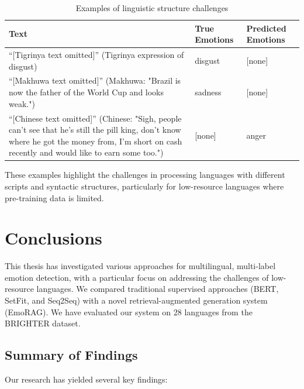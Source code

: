 \documentclass[a4paper,12pt]{extarticle}
\begin{document}
\begin{table}[h]
\centering
\begin{tabular}{|p{8.5cm}|p{2.5cm}|p{2.5cm}|}
\hline
\textbf{Text} & \textbf{True Emotions} & \textbf{Predicted Emotions} \\
\hline
``[Tigrinya text omitted]'' \newline (Tigrinya expression of disgust) & disgust & [none] \\
\hline
``[Makhuwa text omitted]'' \newline (Makhuwa: "Brazil is now the father of the World Cup and looks weak.") & sadness & [none] \\
\hline
``[Chinese text omitted]'' \newline (Chinese: "Sigh, people can't see that he's still the pill king, don't know where he got the money from, I'm short on cash recently and would like to earn some too.") & [none] & anger \\
\hline
\end{tabular}
\caption{Examples of linguistic structure challenges}
\label{tab:linguistic-structure}
\end{table}

These examples highlight the challenges in processing languages with different scripts and syntactic structures, particularly for low-resource languages where pre-training data is limited.

\section{Conclusions}

This thesis has investigated various approaches for multilingual, multi-label emotion detection, with a particular focus on addressing the challenges of low-resource languages. We compared traditional supervised approaches (BERT, SetFit, and Seq2Seq) with a novel retrieval-augmented generation system (EmoRAG). We have evaluated our system on 28 languages from the BRIGHTER dataset.

\subsection{Summary of Findings}

Our research has yielded several key findings:
\end{document}
